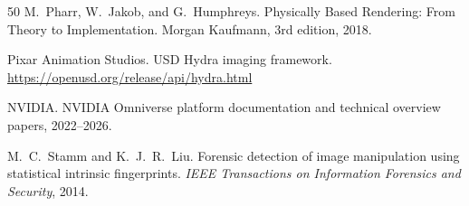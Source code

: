 \documentclass[sigconf,nonacm]{acmart}
\begin{document}
\begin{thebibliography}{50}
M.~Pharr, W.~Jakob, and G.~Humphreys.
\newblock Physically Based Rendering: From Theory to Implementation.
\newblock Morgan Kaufmann, 3rd edition, 2018.

Pixar Animation Studios.
\newblock USD Hydra imaging framework.
\newblock \url{https://openusd.org/release/api/hydra.html}

NVIDIA.
\newblock NVIDIA Omniverse platform documentation and technical
  overview papers, 2022--2026.

M.~C.~Stamm and K.~J.~R.~Liu.
\newblock Forensic detection of image manipulation using statistical
  intrinsic fingerprints.
\newblock \emph{IEEE Transactions on Information Forensics and
  Security}, 2014.

\end{thebibliography}
\fi
\end{document}
